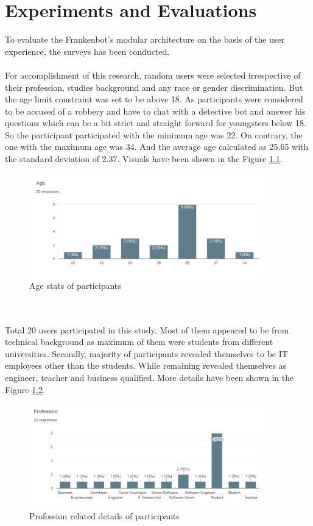 \chapter{Experiments and Evaluations\label{cha:chapter4}}

To evaluate the Frankenbot's modular architecture on the basis of the user experience, the surveys has been conducted. 
\\~\\
For accomplishment of this research, random users were selected irrespective of their profession, studies background and any race or gender discrimination. But the age limit constraint was set to be above 18. As participants were considered to be accused of a robbery and have to chat with a detective bot and answer his questions which can be a bit strict and straight forward for youngsters below 18. So the participant participated with the minimum age was 22. On contrary, the one with the maximum age was 34. And the average age calculated as 25.65 with the standard deviation of 2.37. Visuals have been shown in the Figure \ref{fig:ageGraph}.

\begin{figure}[!h]
    \centering
    \includegraphics[width=0.9\textwidth]{img/Age_Graph.PNG}
    \caption{Age stats of participants}
    \label{fig:ageGraph}
\end{figure}
\\~\\
Total 20 users participated in this study. Most of them appeared to be from technical background as maximum of them were students from different universities. Secondly, majority of participants revealed themselves to be IT employees other than the students. While remaining revealed themselves as engineer, teacher and business qualified. More details have been shown in the Figure \ref{fig:profGraph}.

\begin{figure}[!h]
    \centering
    \includegraphics[width=0.9\textwidth]{img/Profession_Graph.PNG}
    \caption{Profession related details of participants}
    \label{fig:profGraph}
\end{figure}

